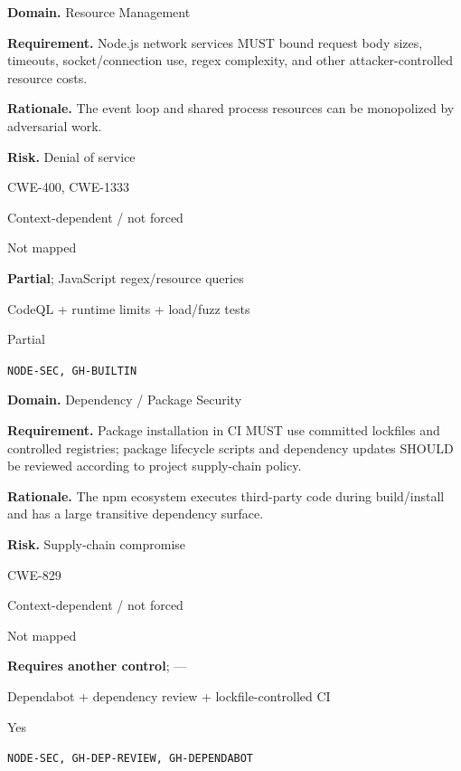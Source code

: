 \documentclass[10pt,letterpaper]{article}
\newcommand{\prioritybadge}[2]{\tcbox[on line,boxrule=0pt,arc=1.2mm,boxsep=0.7mm,left=1mm,right=1mm,top=0.4mm,bottom=0.4mm,colback=#2!12,coltext=#2]{\scriptsize\bfseries #1}}
\begin{document}
\begin{rulebox}[title={\texttt{SCS-JS-RESOURCE-001} \hfill \prioritybadge{High Priority}{High}}]
\textbf{Domain.} Resource Management

\textbf{Requirement.} Node.js network services MUST bound request body sizes, timeouts, socket/connection use, regex complexity, and other attacker-controlled resource costs.

\textbf{Rationale.} The event loop and shared process resources can be monopolized by adversarial work.

\textbf{Risk.} Denial of service

\begin{description}[leftmargin=2.65cm,labelwidth=2.3cm,style=nextline,itemsep=1pt,topsep=3pt]
  \item[CWE] CWE-400, CWE-1333
  \item[OWASP] Context-dependent / not forced
  \item[CERT] Not mapped
  \item[CodeQL] \textbf{Partial}; JavaScript regex/resource queries
  \item[Enforcement] CodeQL + runtime limits + load/fuzz tests
  \item[Automation] Partial
  \item[Sources] \texttt{NODE-SEC, GH-BUILTIN}
\end{description}
\end{rulebox}

\begin{rulebox}[title={\texttt{SCS-JS-DEP-001} \hfill \prioritybadge{Critical Control}{Critical}}]
\textbf{Domain.} Dependency / Package Security

\textbf{Requirement.} Package installation in CI MUST use committed lockfiles and controlled registries; package lifecycle scripts and dependency updates SHOULD be reviewed according to project supply-chain policy.

\textbf{Rationale.} The npm ecosystem executes third-party code during build/install and has a large transitive dependency surface.

\textbf{Risk.} Supply-chain compromise

\begin{description}[leftmargin=2.65cm,labelwidth=2.3cm,style=nextline,itemsep=1pt,topsep=3pt]
  \item[CWE] CWE-829
  \item[OWASP] Context-dependent / not forced
  \item[CERT] Not mapped
  \item[CodeQL] \textbf{Requires another control}; ---
  \item[Enforcement] Dependabot + dependency review + lockfile-controlled CI
  \item[Automation] Yes
  \item[Sources] \texttt{NODE-SEC, GH-DEP-REVIEW, GH-DEPENDABOT}
\end{description}
\end{rulebox}
\end{document}
